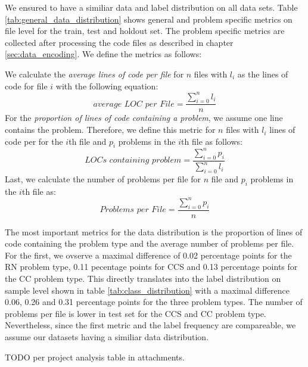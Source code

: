 We ensured to have a similiar data and label distribution on all data sets. Table \ref{tab:general_data_distribution} shows general and problem specific metrics on file level for the train, test and holdout set. The problem specific metrics are collected after processing the code files as described in chapter \ref{sec:data_encoding}. We define the metrics as follows:

We calculate the \textit{average lines of code per file} for $n$ files with $l_i$ as the lines of code for file $i$ with the following equation:
\[
  \textit{average LOC per File} = \frac{\sum_{i=0}^n{l_i}}{n}  
\]
For the \textit{proportion of lines of code containing a problem}, we assume one line contains the problem. Therefore, we define this metric for $n$ files with $l_i$ lines of code per for the $i$th file and $p_i$ problems in the $i$th file as follows:
\[
    \textit{LOCs containing problem} = \frac{\sum_{i=0}^n{p_i}}{\sum_{i=0}^n{l_i}}
\]
Last, we calculate the number of problems per file for $n$ file and $p_i$ problems in the $i$th file as:
\[
    \textit{Problems per File} = \frac{\sum_{i=0}^n{p_i}}{n}
\]

The most important metrics for the data distribution is the proportion of lines of code containing the problem type and the average number of problems per file. For the first, we ovserve a maximal difference of 0.02 percentage points for the RN problem type, 0.11 pecentage points for CCS and 0.13 percentage points for the CC problem type. This directly translates into the label distribution on sample level shown in table \ref{tab:class_distribution} with a maximal difference 0.06, 0.26 and 0.31 percentage points for the three problem types.
The number of problems per file is lower in test set for the CCS and CC problem type. Nevertheless, since the first metric and the label frequency are compareable, we assume our datasets having a similiar data distribution. 

TODO per project analysis table in attachments.

